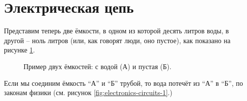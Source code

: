 \documentclass[../sparc.tex]{subfiles}
\begin{document}
\section{Электрическая цепь}

Представим теперь две ёмкости, в одном из которой десять литров воды, в другой
-- ноль литров (или, как говорят люди, оно пустое), как показано на рисунке
\ref{fig:electronics-circuits-0}.

\begin{figure}[ht]
  \centering
  \caption{Пример двух ёмкостей: с водой (А) и пустая (Б).}
  \label{fig:electronics-circuits-0}
\end{figure}

Если мы соединим ёмкость ``А'' и ``Б'' трубой, то вода потечёт из ``А'' в ``Б'',
по законам физики (см. рисунок \ref{fig:electronics-circuits-1}.)
\end{document}
